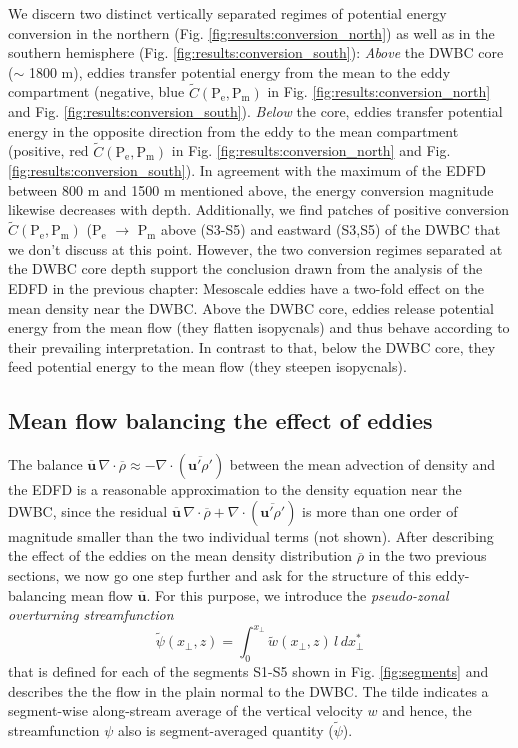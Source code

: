\documentclass{ametsoc}
\begin{document}
We discern two distinct vertically separated regimes of potential energy conversion in the northern (Fig. \ref{fig:results:conversion_north}) as well as in the southern hemisphere (Fig. \ref{fig:results:conversion_south}): \textit{Above} the DWBC core ($\sim$ 1800 m), eddies transfer potential energy from the mean to the eddy compartment (negative, blue $\tilde{C}(\text{P}_\text{e},\text{P}_\text{m})$ in Fig. \ref{fig:results:conversion_north} and Fig. \ref{fig:results:conversion_south}). \textit{Below} the core, eddies transfer potential energy in the opposite direction from the eddy to the mean compartment (positive, red $\tilde{C}(\text{P}_\text{e},\text{P}_\text{m})$ in Fig. \ref{fig:results:conversion_north} and Fig. \ref{fig:results:conversion_south}). In agreement with the maximum of the EDFD between 800 m and 1500 m mentioned above, the energy conversion magnitude likewise decreases with depth. Additionally, we find patches of positive conversion $\tilde{C}(\text{P}_\text{e},\text{P}_\text{m})$ ($\text{P}_\text{e}$ $\rightarrow$ $\text{P}_\text{m}$ above (S3-S5) and eastward (S3,S5) of the DWBC that we don't discuss at this point. However, the two conversion regimes separated at the DWBC core depth support the conclusion drawn from the analysis of the EDFD in the previous chapter: Mesoscale eddies have a two-fold effect on the mean density near the DWBC. Above the DWBC core, eddies release potential energy from the mean flow (they flatten isopycnals) and thus behave according to their prevailing interpretation. In contrast to that, below the DWBC core, they feed potential energy to the mean flow (they steepen isopycnals). 
\subsection{Mean flow balancing the effect of eddies}
The balance $\mathbf{\overline {u}}\,\nabla \cdot \overline{\rho} \approx -\nabla \cdot (\overline{\mathbf u' \rho'})$  between the mean advection of density and the EDFD is a reasonable approximation to the density equation near the DWBC, since the residual $\mathbf{\overline {u}}\,\nabla \cdot \overline{\rho} + \nabla \cdot (\overline{\mathbf u' \rho'})$ is more than one order of magnitude smaller than the two individual terms (not shown). After describing the effect of the eddies on the mean density distribution $\overline{\rho}$ in the two previous sections, we now go one step further and ask for the structure of this eddy-balancing mean flow $\overline{\mathbf{u}}$.  For this purpose, we introduce the \textit{pseudo-zonal overturning streamfunction} 
\begin{equation}
\tilde{\psi} (x_\perp,z) = \int_0^{x_\perp} \tilde{w}(x_\perp,z) \,l \,dx_\perp^*
\end{equation}
that is defined for each of the segments S1-S5 shown in Fig. \ref{fig:segments} and describes the the flow in the plain normal to the DWBC. The tilde indicates a segment-wise along-stream average of the vertical velocity $w$ and hence, the streamfunction $\psi$ also is segment-averaged quantity ($\tilde{\psi}$). 
\end{document}
